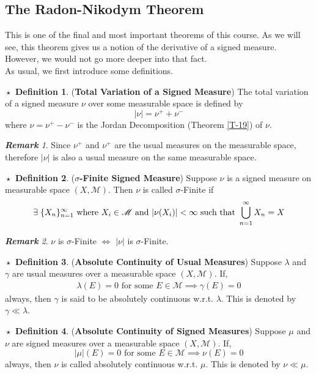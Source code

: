 \documentclass{article}
\theoremstyle{definition}
\newtheorem{definition}{$\boxed{\star}$ Definition}
\theoremstyle{remark}
\newtheorem*{remark}{\textbf{Remark}}
\theoremstyle{definition}
\theoremstyle{definition}
\theoremstyle{definition}
\newcommand{\abs}[1]{\left \vert #1\right \vert}
\newcommand{\bunion}{\bigcup}
\newcommand{\alg}[1]{\mathscr{#1}}
\begin{document}
\subsection{The Radon-Nikodym Theorem}
This is one of the final and most important theorems of this course. As we will see, this theorem gives us a notion of the derivative of a signed measure. However, we would not go more deeper into that fact. \\
As usual, we first introduce some definitions.
\begin{definition}
	(\textbf{Total Variation of a Signed Measure}) The total variation of a signed measure $ \nu $ over some measurable space is defined by
	\[\abs{\nu} = \nu^{+} + \nu^{-}\]
	where $ \nu = \nu^{+} - \nu^{-}$ is the Jordan Decomposition (Theorem \ref{T-19}) of $ \nu $. 
\end{definition}
\begin{remark}
	Since $ \nu^{+} $ and $ \nu^{+} $ are the usual measures on the measurable space, therefore $ \abs{\nu} $ is also a usual measure on the same measurable space.
\end{remark}
\hrulefill
\begin{definition}
	(\textbf{$ \sigma $-Finite Signed Measure}) Suppose $ \nu $ is a signed measure on measurable space $ (X,\alg{M}) $. Then $ \nu $ is called $ \sigma $-Finite if 
	\[\exists\;\{X_n\}_{n=1}^{\infty}\text{ where $ X_i \in \alg{M} $ and $ \abs{\nu(X_i)} < \infty $ such that }\bunion_{n=1}^{\infty} X_n = X \]
\end{definition}
\begin{remark}
	$ \nu $ is $ \sigma $-Finite $ \bm{\iff} $ $ \abs{\nu} $ is $ \sigma $-Finite.
\end{remark}
\hrulefill
\begin{definition}
	(\textbf{Absolute Continuity of Usual Measures}) Suppose $ \lambda $ and $ \gamma$ are usual measures over a measurable space $ (X,\alg{M}) $. If,
	\begin{align*}
\lambda(E) = 0 \text{ for some }  E\in \alg{M} \implies \gamma(E) = 0
	\end{align*}
	always, then $ \gamma $ is said to be absolutely continuous w.r.t. $ \lambda $. This is denoted by $ \gamma \ll \lambda $.
\end{definition}
\hrulefill
\begin{definition}
	(\textbf{Absolute Continuity of Signed Measures}) Suppose $ \mu $ and $ \nu $ are signed measures over a measurable space $ (X,\alg{M}) $. If,
	\[\abs{\mu}(E) = 0 \text{ for some } E\in \alg{M} \implies \nu(E) = 0\]
	always, then $ \nu $ is called absolutely continuous w.r.t. $ \mu $. This is denoted by $ \nu \ll \mu $.
\end{definition}
\end{document}
